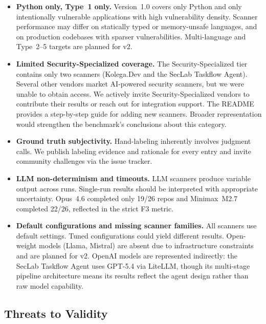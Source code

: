 \begin{itemize}
  \item \textbf{Python only, Type~1 only.}
    Version~1.0 covers only Python and only intentionally vulnerable applications with high vulnerability density. Scanner performance may differ on statically typed or memory-unsafe languages, and on production codebases with sparser vulnerabilities. Multi-language and Type~2--5 targets are planned for v2.

  \item \textbf{Limited Security-Specialized coverage.}
    The Security-Specialized tier contains only two scanners (Kolega.Dev and the SecLab Taskflow Agent). Several other vendors market AI-powered security scanners, but we were unable to obtain access. We actively invite Security-Specialized vendors to contribute their results or reach out for integration support. The README provides a step-by-step guide for adding new scanners. Broader representation would strengthen the benchmark's conclusions about this category.

  \item \textbf{Ground truth subjectivity.}
    Hand-labeling inherently involves judgment calls. We publish labeling evidence and rationale for every entry and invite community challenges via the issue tracker.

  \item \textbf{LLM non-determinism and timeouts.}
    LLM scanners produce variable output across runs. Single-run results should be interpreted with appropriate uncertainty. Opus~4.6 completed only 19/26 repos and Minimax~M2.7 completed 22/26, reflected in the strict F3 metric.

  \item \textbf{Default configurations and missing scanner families.}
    All scanners use default settings. Tuned configurations could yield different results. Open-weight models (Llama, Mistral) are absent due to infrastructure constraints and are planned for v2. OpenAI models are represented indirectly: the SecLab Taskflow Agent uses GPT-5.4 via LiteLLM, though its multi-stage pipeline architecture means its results reflect the agent design rather than raw model capability.

\end{itemize}

\subsection{Threats to Validity}
\label{sec:threats}

